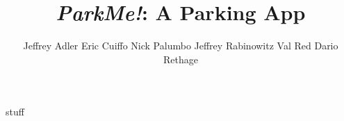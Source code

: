 \documentclass{memoir}
\title{\emph{ParkMe!}: A Parking App}
\author{
	Jeffrey Adler
	Eric Cuiffo
	Nick Palumbo
	Jeffrey Rabinowitz
	Val Red
	Dario Rethage
	}
\begin{document}
stuff
\end{document}

